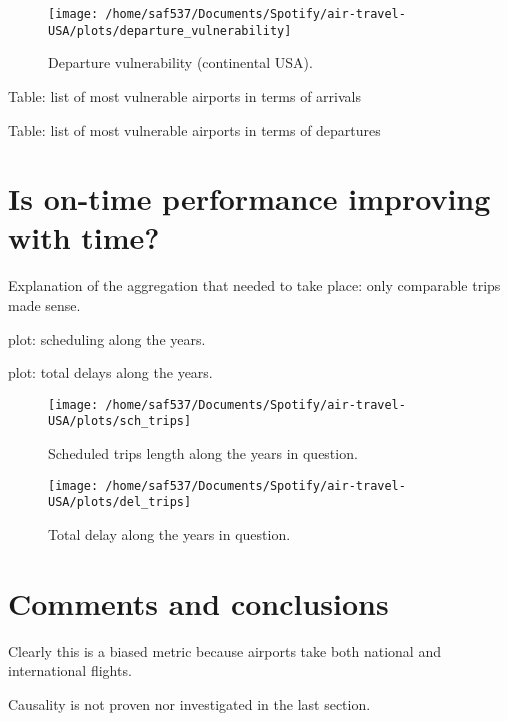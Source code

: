 \documentclass[a4paper, 11pt]{article}
\begin{document}
\begin{figure}[!ht]
  \caption{Departure vulnerability (continental USA).}
  \label{m_days}
  \centering
    \texttt{[image: /home/saf537/Documents/Spotify/air-travel-USA/plots/departure\_vulnerability]}
\end{figure}


Table: list of most vulnerable airports in terms of arrivals

Table: list of most vulnerable airports in terms of departures


\section*{Is on-time performance improving with time?}

Explanation of the aggregation that needed to take place: only comparable trips made sense.

plot: scheduling along the years.

plot: total delays along the years.


\begin{figure}[!ht]
  \caption{Scheduled trips length along the years in question.}
  \label{m_days}
  \centering
    \texttt{[image: /home/saf537/Documents/Spotify/air-travel-USA/plots/sch\_trips]}
\end{figure}


\begin{figure}[!ht]
  \caption{Total delay along the years in question.}
  \label{m_days}
  \centering
    \texttt{[image: /home/saf537/Documents/Spotify/air-travel-USA/plots/del\_trips]}
\end{figure}

\section*{Comments and conclusions}

Clearly this is a biased metric because airports take both national and international flights.

Causality is not proven nor investigated in the last section.

\end{document}
